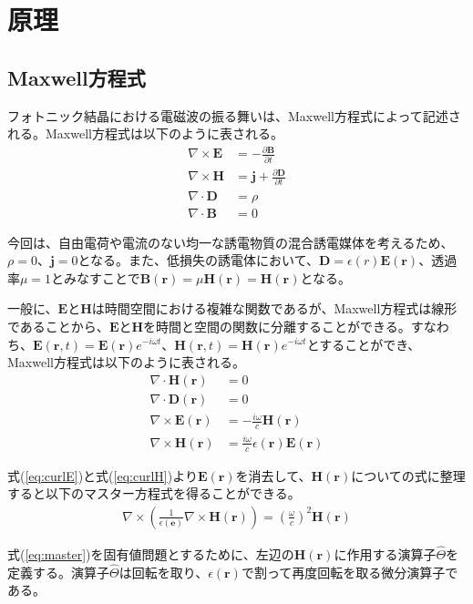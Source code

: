 \documentclass[platex,dvipdfmx]{jsreport}
\numberwithin{equation}{section}
\begin{document}
\chapter{原理}
\section{Maxwell方程式}
フォトニック結晶における電磁波の振る舞いは、Maxwell方程式によって記述される。Maxwell方程式は以下のように表される。
\begin{align}
  \nabla \times \bm{E} &= -\frac{\partial \bm{B}}{\partial t} \\
  \nabla \times \bm{H} &= \bm{j} + \frac{\partial \bm{D}}{\partial t} \\
  \nabla \cdot \bm{D} &= \rho \\
  \nabla \cdot \bm{B} &= 0
\end{align}

今回は、自由電荷や電流のない均一な誘電物質の混合誘電媒体を考えるため、$\rho = 0$、$\bm{j} = 0$となる。また、低損失の誘電体において、$\bm{D} = \epsilon(r) \bm{E}(\bm{r})$、透過率$\mu = 1$とみなすことで$\bm{B}(\bm{r}) = \mu \bm{H}(\bm{r}) = \bm{H}(\bm{r})$となる。

一般に、$\bm{E}$と$\bm{H}$は時間空間における複雑な関数であるが、Maxwell方程式は線形であることから、$\bm{E}$と$\bm{H}$を時間と空間の関数に分離することができる。すなわち、$\bm{E}(\bm{r},t) = \bm{E}(\bm{r}) e^{-i\omega t}$、$\bm{H}(\bm{r},t) = \bm{H}(\bm{r}) e^{-i\omega t}$とすることができ、Maxwell方程式は以下のように表される。
\begin{align}
  \nabla \cdot \bm{H}(\bm{r}) &= 0 \\
  \nabla \cdot \bm{D}(\bm{r}) &= 0 \\
  \label{eq:curlE}
  \nabla \times \bm{E}(\bm{r}) &= - \frac{i \omega}{c} \bm{H}(\bm{r}) \\
  \label{eq:curlH}
  \nabla \times \bm{H} (\bm{r}) &= \frac{i \omega}{c} \epsilon(\bm{r}) \bm{E}(\bm{r})
\end{align}

式(\ref{eq:curlE})と式(\ref{eq:curlH})より$\bm{E}(\bm{r})$を消去して、$\bm{H}(\bm{r})$についての式に整理すると以下のマスター方程式を得ることができる。
\begin{align}
  \label{eq:master}
  \nabla \times \left( \frac{1}{\epsilon (\bm{e})} \nabla \times \bm{H}(\bm{r}) \right) = \left( \frac{\omega}{c} \right)^2 \bm{H}(\bm{r}) 
\end{align}

式(\ref{eq:master})を固有値問題とするために、左辺の$\bm{H}(\bm{r})$に作用する演算子$\hat{\Theta}$を定義する。演算子$\hat{\Theta}$は回転を取り、$\epsilon(\bm{r})$で割って再度回転を取る微分演算子である。
\end{document}
